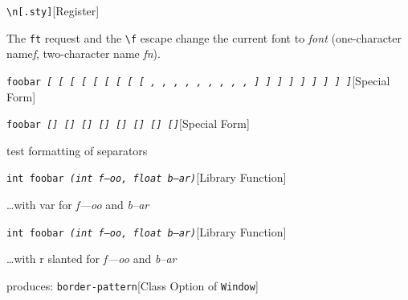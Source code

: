 \documentclass{book}
\begin{document}
%
\noindent\texttt{\texttt{\textbackslash{}n{[}.sty{]}}}\hfill[Register]



%
The \texttt{ft} request and the \texttt{\textbackslash{}f} escape change the current font
to \textsl{font} (one-character name\hbox{}\textsl{f}, two-character name
\textsl{fn}).

\noindent\texttt{foobar \bgroup{}\normalfont{}\textsl{{[} \textnormal{{[}} \textsl{{[}} \texttt{{[}} \texttt{{[}} \textnormal{\textsl{{[}}} \textnormal{\texttt{{[}}} \textnormal{\texttt{\textsl{{[}}}} \textnormal{\texttt{{[}}} , \textnormal{,} \textsl{,} \texttt{,} \texttt{,} \textnormal{\textsl{,}} \textnormal{\texttt{,}} \textnormal{\texttt{\textsl{,}}} \textnormal{\texttt{,}} {]} \textnormal{{]}} \textsl{{]}} \texttt{{]}} \texttt{{]}} \textnormal{\textsl{{]}}} \textnormal{\texttt{{]}}} \textnormal{\texttt{\textsl{{]}}}} \textnormal{\texttt{{]}}}}\egroup{}}\hfill[Special Form]



%
\noindent\texttt{foobar \bgroup{}\normalfont{}\textsl{{[}{]} \textnormal{{[}{]}} \textsl{{[}{]}} \texttt{{[}{]}} \texttt{{[}{]}} \textnormal{\textsl{{[}{]}}} \textnormal{\texttt{{[}{]}}} \textnormal{\texttt{\textsl{{[}{]}}}}}\egroup{}}\hfill[Special Form]



%
test formatting of separators

\noindent\texttt{int foobar \bgroup{}\normalfont{}\textsl{(int \textsl{f---oo}, float \textsl{b--ar})}\egroup{}}\hfill[Library Function]



%
\dots{}\@ with var for \textsl{f---oo} and \textsl{b--ar}

\noindent\texttt{int foobar \bgroup{}\normalfont{}\textsl{(int \textnormal{\textsl{f---oo}}, float \textnormal{\textsl{b--ar}})}\egroup{}}\hfill[Library Function]



%
\dots{}\@ with r slanted for \textsl{f---oo} and \textsl{b--ar}

\noindent{}produces:
\noindent\texttt{border-pattern}\hfill[Class Option of \texttt{Window}]
\end{document}
